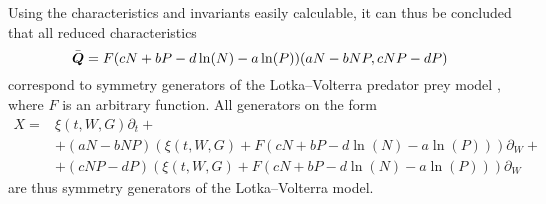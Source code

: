 Using the characteristics and invariants easily calculable, it can thus be concluded that all reduced characteristics
\begin{equation*} %
  \bar{\vect{Q}} = F\left(cN + bP - d \ln\left(N\right) - a \ln\left(P\right)\right) \left(a N - b N P, c N P - d P\right)
\end{equation*}
correspond to symmetry generators of the Lotka--Volterra predator prey model , where \(F\) is an arbitrary function.
All generators on the form
\begin{align*}
  X =& \xi(t, W, G) \partial_t + \\
  &+ \left(a N - b N P\right) \left(\xi(t, W, G) + F\left(cN + bP - d \ln\left(N\right) - a \ln\left(P\right)\right)\right) \partial_W + \\
  &+ \left(c N P - d P\right) \left(\xi(t, W, G) + F\left(cN + bP - d \ln\left(N\right) - a \ln\left(P\right)\right)\right) \partial_W
\end{align*}
are thus symmetry generators of the Lotka--Volterra model.
